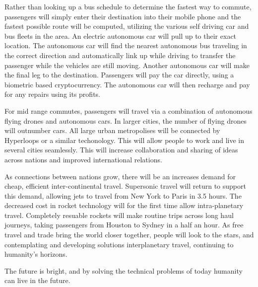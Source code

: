 Rather than looking up a bus schedule to determine the fastest way to commute, passengers will simply enter their destination into their mobile phone and the fastest possible route will be computed, utilizing the various self driving car and bus fleets in the area.
An electric autonomous car will pull up to their exact location.
The autonomous car will find the nearest autonomous bus traveling in the correct direction and automatically link up while driving to transfer the passenger while the vehicles are still moving.
Another autonomous car will make the final leg to the destination.
Passengers will pay the car directly, using a biometric based cryptocurrency.
The autonomous car will then recharge and pay for any repairs using its profits.

For mid range commutes, passengers will travel via a combination of autonomous flying drones and autonomous cars.
In larger cities, the number of flying drones will outnumber cars.
All large urban metropolises will be connected by Hyperloops or a similar techonology.
This will allow people to work and live in several cities seamlessly.
This will increase collaboration and sharing of ideas across nations and improved international relations.

As connections between nations grow, there will be an increases demand for cheap, efficient inter-continental travel.
Supersonic travel will return to support this demand, allowing jets to travel from New York to Paris in 3.5 hours.
The decreased cost in rocket technology will for the first time allow intra-planetary travel.
Completely resuable rockets will make routine trips across long haul journeys, taking passengers from Houston to Sydney in a half an hour.
As free travel and trade bring the world closer together, people will look to the stars, and contemplating and developing solutions interplanetary travel, continuing to humanity's horizons.

The future is bright, and by solving the technical problems of today humanity can live in the future.
